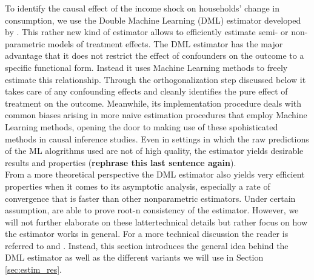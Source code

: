 To identify the causal effect of the income shock on households' change in consumption, we use the Double Machine Learning (DML) estimator developed by \cite{DML2017}. This rather new kind of estimator allows to efficiently estimate semi- or non-parametric models of treatment effects. The DML estimator has the major advantage that it does not restrict the effect of confounders on the outcome to a specific functional form. Instead it uses Machine Learning methods to freely estimate this relationship. Through the orthogonalization step discussed below it takes care of any confounding effects and cleanly identifies the pure effect of treatment on the outcome. Meanwhile, its implementation procedure deals with common biases arising in more naive estimation procedures that employ Machine Learning methods, opening the door to making use of these spohisticated methods in causal inference studies. Even in settings in which the raw predictions of the ML alogrithms used are not of high quality, the estimator yields desirable results and properties (\textbf{rephrase this last sentence again}).\\
From a more theoretical perspective the DML estimator also yields very efficient properties when it comes to its asymptotic analysis, especially a rate of convergence that is faster than other nonparametric estimators. Under certain assumption, \cite{DML2017} are able to prove root-n consistency of the estimator. However, we will not further elaborate on these lattertechnical details but rather focus on how the estimator works in general. For a more technical discussion the reader is referred to \cite{DML2017} and \cite{PanelDML}. Instead, this section introduces the general idea behind the DML estimator as well as the different variants we will use in Section \ref{sec:estim_res}. 

